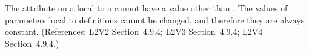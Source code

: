 The  attribute on a \Parameter local to a \KineticLaw cannot
have a value other than .  The values of parameters local to
\KineticLaw definitions cannot be changed, and therefore they are always
constant.  (References: L2V2 Section~4.9.4; L2V3
Section~4.9.4; L2V4 Section~4.9.4.)
